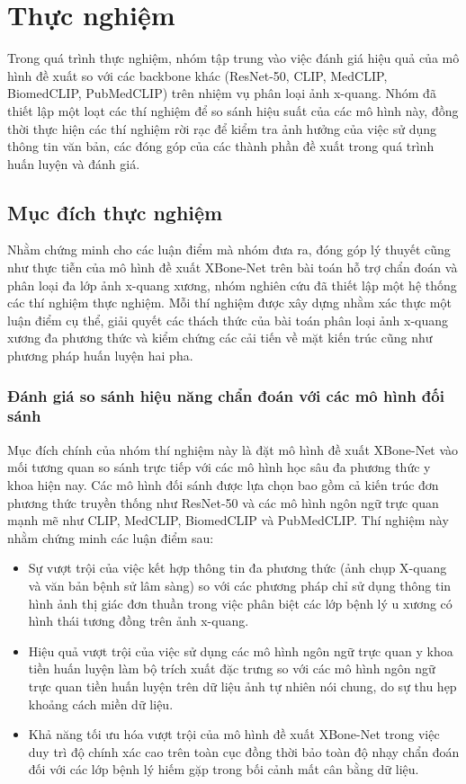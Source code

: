 \chapter{Thực nghiệm}
Trong quá trình thực nghiệm, nhóm tập trung vào việc đánh giá hiệu quả của mô hình đề xuất so với các backbone khác (ResNet-50, CLIP, MedCLIP, BiomedCLIP, PubMedCLIP) trên nhiệm vụ phân loại ảnh x-quang. Nhóm đã thiết lập một loạt các thí nghiệm để so sánh hiệu suất của các mô hình này, đồng thời thực hiện các thí nghiệm rời rạc để kiểm tra ảnh hưởng của việc sử dụng thông tin văn bản, các đóng góp của các thành phần đề xuất trong quá trình huấn luyện và đánh giá.

\section{Mục đích thực nghiệm}
Nhằm chứng minh cho các luận điểm mà nhóm đưa ra, đóng góp lý thuyết cũng như thực tiễn của mô hình đề xuất XBone-Net trên bài toán hỗ trợ chẩn đoán và phân loại đa lớp ảnh x-quang xương, nhóm nghiên cứu đã thiết lập một hệ thống các thí nghiệm thực nghiệm. Mỗi thí nghiệm được xây dựng nhằm xác thực một luận điểm cụ thể, giải quyết các thách thức của bài toán phân loại ảnh x-quang xương đa phương thức và kiểm chứng các cải tiến về mặt kiến trúc cũng như phương pháp huấn luyện hai pha.

\subsection{Đánh giá so sánh hiệu năng chẩn đoán với các mô hình đối sánh}
Mục đích chính của nhóm thí nghiệm này là đặt mô hình đề xuất XBone-Net vào mối tương quan so sánh trực tiếp với các mô hình học sâu đa phương thức y khoa hiện nay. Các mô hình đối sánh được lựa chọn bao gồm cả kiến trúc đơn phương thức truyền thống như ResNet-50 và các mô hình ngôn ngữ trực quan mạnh mẽ như CLIP, MedCLIP, BiomedCLIP và PubMedCLIP. Thí nghiệm này nhằm chứng minh các luận điểm sau:
\begin{itemize}
    \item Sự vượt trội của việc kết hợp thông tin đa phương thức (ảnh chụp X-quang và văn bản bệnh sử lâm sàng) so với các phương pháp chỉ sử dụng thông tin hình ảnh thị giác đơn thuần trong việc phân biệt các lớp bệnh lý u xương có hình thái tương đồng trên ảnh x-quang.
    \item Hiệu quả vượt trội của việc sử dụng các mô hình ngôn ngữ trực quan y khoa tiền huấn luyện làm bộ trích xuất đặc trưng so với các mô hình ngôn ngữ trực quan tiền huấn luyện trên dữ liệu ảnh tự nhiên nói chung, do sự thu hẹp khoảng cách miền dữ liệu.
    \item Khả năng tối ưu hóa vượt trội của mô hình đề xuất XBone-Net trong việc duy trì độ chính xác cao trên toàn cục đồng thời bảo toàn độ nhạy chẩn đoán đối với các lớp bệnh lý hiếm gặp trong bối cảnh mất cân bằng dữ liệu.
\end{itemize}

